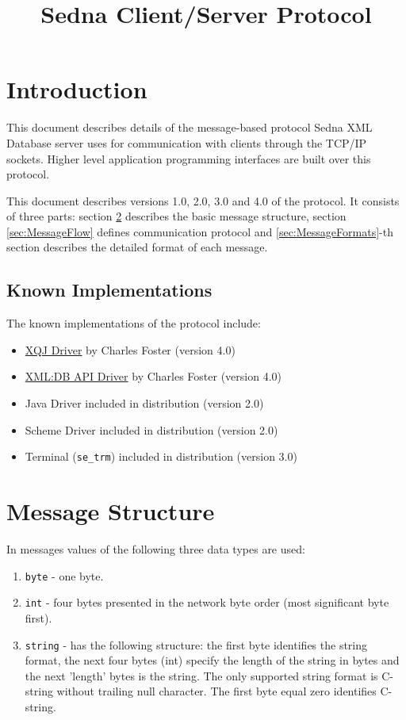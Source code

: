 \documentclass[a4paper,12pt]{article}
\title{Sedna Client/Server Protocol}
\date{}
\newcommand{\TocAt}[6]{}   %
\begin{document}
\maketitle

\TocAt*{section,subsection,subsubsection}
\TocAt*{subsection,subsubsection}

\tableofcontents
\setlength{\parskip}{1ex plus 0.5ex minus 0.2ex}
\newpage
\section{Introduction}
This document describes details of the message-based protocol Sedna XML Database server uses for communication with clients through the TCP/IP sockets. 
Higher level application programming interfaces are built over this protocol.

This document describes versions 1.0, 2.0, 3.0 and 4.0 of the protocol. It consists of three parts: section \ref{sec:MessageStructure} describes
the basic message structure, section \ref{sec:MessageFlow} defines communication protocol and \ref{sec:MessageFormats}-th section describes the detailed format of each message.

\subsection{Known Implementations}
The known implementations of the protocol include:
\begin{itemize}
\item \href{http://www.cfoster.net/sedna/xqj/}{XQJ Driver} by Charles Foster (version 4.0)
\item \href{http://www.cfoster.net/sedna/}{XML:DB API Driver} by Charles Foster (version 4.0)
\item Java Driver included in distribution (version 2.0)
\item Scheme Driver included in distribution (version 2.0)
\item Terminal (\verb!se_trm!) included in distribution (version 3.0)
\end{itemize}

\newpage

\section{Message Structure}
\label{sec:MessageStructure}
In messages values of the following three data types are used:
\begin{enumerate}
\item \verb!byte! - one byte.
\item \verb!int! - four bytes presented in the network byte order (most significant byte first).
\item \verb!string! - has the following structure: the first byte identifies the string format, the next four bytes (int) specify the length of the string in bytes and the next 'length' bytes is the string. The only supported string format is C-string without trailing null character. The first byte equal zero identifies C-string.
\end{enumerate}
\end{document}
